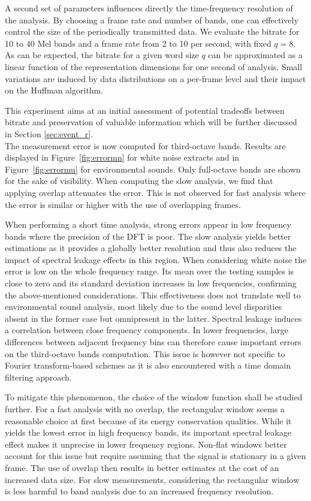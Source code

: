 \documentclass[sensors,article,submit,moreauthors,pdftex,10pt,a4paper]{mdpi}
\begin{document}
A second set of parameters influences directly the time-frequency resolution of the analysis. By choosing a frame rate and number of bands, one can effectively control the size of the periodically transmitted data. We evaluate the bitrate for 10 to 40 Mel bands and a frame rate from 2 to 10 per second, with fixed $q = 8$. As can be expected, the bitrate for a given word size $q$ can be approximated as a linear function of the representation dimensions for one second of analysis. Small variations are induced by data distributions on a per-frame level and their impact on the Huffman algorithm.

This experiment aims at an initial assessment of potential tradeoffs between bitrate and preservation of valuable information which will be further discussed in Section \ref{sec:event_r}.\\

The measurement error is now computed for third-octave bands. Results are displayed in Figure~\ref{fig:errormn} for white noise extracts and in Figure~\ref{fig:errormu} for environmental sounds. Only full-octave bands are shown for the sake of visibility. When computing the slow analysis, we find that applying overlap attenuates the error. This is not observed for fast analysis where the error is similar or higher with the use of overlapping frames.

When performing a short time analysis, strong errors appear in low frequency bands where the precision of the DFT is poor. The slow analysis yields better estimations as it provides a globally better resolution and thus also reduces the impact of spectral leakage effects in this region. When considering white noise the error is low on the whole frequency range. Its mean over the testing samples is close to zero and its standard deviation increases in low frequencies, confirming the above-mentioned considerations. This effectiveness does not translate well to environmental sound analysis, most likely due to the sound level disparities absent in the former case but omnipresent in the latter. Spectral leakage induces a correlation between close frequency components. In lower frequencies, large differences between adjacent frequency bins can therefore cause important errors on the third-octave bands computation. This issue is however not specific to Fourier transform-based schemes as it is also encountered with a time domain filtering approach.

To mitigate this phenomenon, the choice of the window function shall be studied further. For a fast analysis with no overlap, the rectangular window seems a reasonable choice at first because of its energy conservation qualities. While it yields the lowest error in high frequency bands, its important spectral leakage effect makes it unprecise in lower frequency regions. Non-flat windows better account for this issue but require assuming that the signal is stationary in a given frame. The use of overlap then results in better estimates at the cost of an increased data size. For slow measurements, considering the rectangular window is less harmful to band analysis due to an increased frequency resolution.
\end{document}
